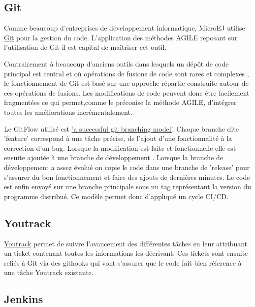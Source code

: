 \documentclass[french,a4paper,12pt]{report}
\begin{document}
\subsection{Git}

Comme beaucoup d'entreprises de développement informatique, MicroEJ utilise \href{https://git-scm.com/}{Git} pour la gestion du code. L'application des méthodes AGILE reposant sur l'utilisation de Git il est capital de maîtriser cet outil.

Contrairement à beaucoup d'anciens outils dans lesquels un dépôt de code principal est central et où opérations de fusions de code sont rares et complexes , le fonctionnement de Git est basé sur une approche répartie construite autour de ces opérations de fusions. Les modifications de code peuvent donc être facilement fragmentées ce qui permet,comme le préconise la méthode AGILE, d'intégrer toutes les améliorations incrémentalement. 

Le GitFlow utilisé est \href{https://nvie.com/posts/a-successful-git-branching-model/}{'a successful git branching model'}. Chaque branche dite 'feature' correspond à une tâche précise, de l'ajout d'une fonctionnalité à la correction d'un bug. Lorsque la modification est faite et fonctionnelle elle est ensuite ajoutée à une branche de développement . Lorsque la branche de développement a assez évolué on copie le code dans une branche de 'release' pour s'assurer du bon fonctionnement et faire des ajouts de dernières minutes. Le code est enfin envoyé sur une branche principale sous un tag représentant la version du programme distribué.
Ce modèle permet donc d'appliqué un cycle CI/CD.

\subsection{Youtrack}

\href{https://www.jetbrains.com/youtrack/}{Youtrack} permet de suivre l'avancement des différentes tâches en leur attribuant un ticket contenant toutes les informations les décrivant.
Ces tickets sont ensuite reliés à Git via des githooks qui vont s'assurer que le code fait bien réference à une tâche Youtrack existante.

\subsection{Jenkins}
\end{document}
